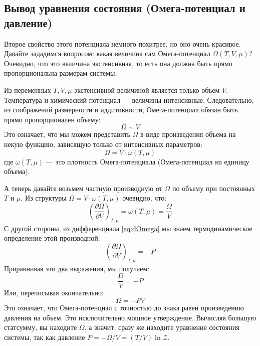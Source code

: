 \documentclass[../general/general]{subfiles}
\begin{document}
\subsection{Вывод уравнения состояния (Омега-потенциал и давление)}

Второе свойство этого потенциала немного похитрее, но оно очень красивое. Давайте зададимся вопросом: какая величина сам Омега-потенциал $\Omega(T, V, \mu)$? Очевидно, что это величина экстенсивная, то есть она должна быть прямо пропорциональна размерам системы. 

Из переменных $T, V, \mu$ экстенсивной величиной является только объем $V$. Температура и химический потенциал — величины интенсивные. Следовательно, из соображений размерности и аддитивности, Омега-потенциал обязан быть прямо пропорционален объему:
\begin{equation*}
    \Omega \sim V
\end{equation*}
Это означает, что мы можем представить $\Omega$ в виде произведения объема на некую функцию, зависящую только от интенсивных параметров:
\begin{equation*}
    \Omega = V \cdot \omega(T, \mu)
\end{equation*}
где $\omega(T, \mu)$ — это плотность Омега-потенциала (Омега-потенциал на единицу объема).

А теперь давайте возьмем частную производную от $\Omega$ по объему при постоянных $T$ и $\mu$. Из структуры $\Omega = V \cdot \omega(T, \mu)$ очевидно, что:
\begin{equation*}
    \left( \frac{\partial \Omega}{\partial V} \right)_{T, \mu} = \omega(T, \mu) = \frac{\Omega}{V}
\end{equation*}
С другой стороны, из дифференциала \eqref{eq:dOmega} мы знаем термодинамическое определение этой производной:
\begin{equation*}
    \left( \frac{\partial \Omega}{\partial V} \right)_{T, \mu} = -P
\end{equation*}
Приравнивая эти два выражения, мы получаем:
\begin{equation*}
    \frac{\Omega}{V} = -P
\end{equation*}
Или, переписывая окончательно:
\begin{equation}
    \Omega = -PV
    \label{eq:Omega_PV}
\end{equation}
Это означает, что Омега-потенциал с точностью до знака равен произведению давления на объем. Это исключительно мощное утверждение. Вычисляя большую статсумму, вы находите $\Omega$, а значит, сразу же находите уравнение состояния системы, так как давление $P = -\Omega/V = (T/V) \ln \mathcal{Z}$.
\end{document}
